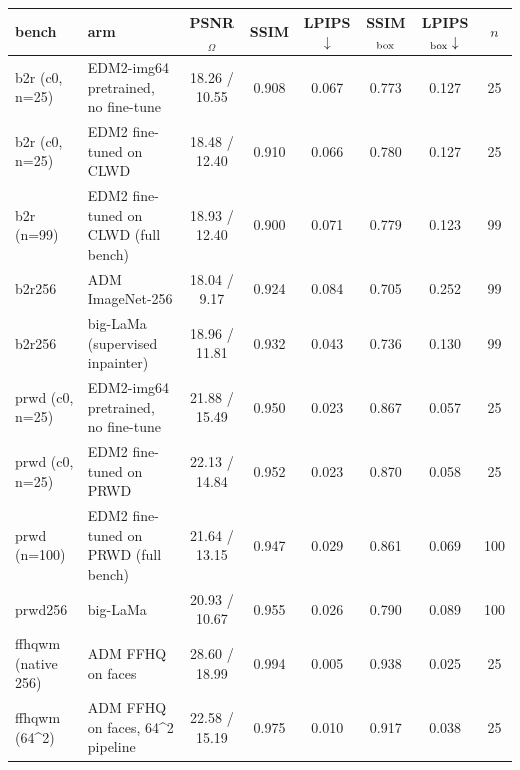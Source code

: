 \begin{tabular}{llcccccc}
\toprule
bench & arm & PSNR$_\Omega$ & SSIM & LPIPS$\downarrow$ & SSIM$_{\rm box}$ & LPIPS$_{\rm box}\downarrow$ & $n$\\
\midrule
b2r (c0, n=25) & EDM2-img64 pretrained, no fine-tune & 18.26 / 10.55 & 0.908 & 0.067 & 0.773 & 0.127 & 25\\
b2r (c0, n=25) & EDM2 fine-tuned on CLWD & 18.48 / 12.40 & 0.910 & 0.066 & 0.780 & 0.127 & 25\\
\midrule
b2r (n=99) & EDM2 fine-tuned on CLWD (full bench) & 18.93 / 12.40 & 0.900 & 0.071 & 0.779 & 0.123 & 99\\
\midrule
b2r256 & ADM ImageNet-256 & 18.04 / 9.17 & 0.924 & 0.084 & 0.705 & 0.252 & 99\\
b2r256 & big-LaMa (supervised inpainter) & 18.96 / 11.81 & 0.932 & 0.043 & 0.736 & 0.130 & 99\\
\midrule
prwd (c0, n=25) & EDM2-img64 pretrained, no fine-tune & 21.88 / 15.49 & 0.950 & 0.023 & 0.867 & 0.057 & 25\\
prwd (c0, n=25) & EDM2 fine-tuned on PRWD & 22.13 / 14.84 & 0.952 & 0.023 & 0.870 & 0.058 & 25\\
\midrule
prwd (n=100) & EDM2 fine-tuned on PRWD (full bench) & 21.64 / 13.15 & 0.947 & 0.029 & 0.861 & 0.069 & 100\\
\midrule
prwd256 & big-LaMa & 20.93 / 10.67 & 0.955 & 0.026 & 0.790 & 0.089 & 100\\
\midrule
ffhqwm (native 256) & ADM FFHQ on faces & 28.60 / 18.99 & 0.994 & 0.005 & 0.938 & 0.025 & 25\\
\midrule
ffhqwm (64^2) & ADM FFHQ on faces, 64^2 pipeline & 22.58 / 15.19 & 0.975 & 0.010 & 0.917 & 0.038 & 25\\
\bottomrule
\end{tabular}
